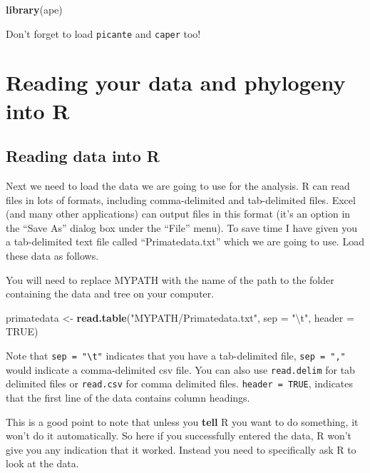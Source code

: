 \documentclass[12pt]{article}
\newcommand{\KeywordTok}[1]{\textcolor[rgb]{0.13,0.29,0.53}{\textbf{{#1}}}}
\newcommand{\DataTypeTok}[1]{\textcolor[rgb]{0.13,0.29,0.53}{{#1}}}
\newcommand{\CharTok}[1]{\textcolor[rgb]{0.31,0.60,0.02}{{#1}}}
\newcommand{\StringTok}[1]{\textcolor[rgb]{0.31,0.60,0.02}{{#1}}}
\newcommand{\OtherTok}[1]{\textcolor[rgb]{0.56,0.35,0.01}{{#1}}}
\newcommand{\NormalTok}[1]{{#1}}
\begin{document}
\begin{snugshade}
\begin{Highlighting}[]
\KeywordTok{library}\NormalTok{(ape)}
\end{Highlighting}
\end{snugshade}

Don't forget to load \texttt{picante} and \texttt{caper} too!

\newpage
\section{Reading your data and phylogeny into R}
\subsection{Reading data into R}

Next we need to load the data we are going to use for the analysis. R
can read files in lots of formats, including comma-delimited and
tab-delimited files. Excel (and many other applications) can output
files in this format (it's an option in the ``Save As'' dialog box
under the ``File'' menu). To save time I have given you a tab-delimited
text file called ``Primatedata.txt'' which we are going to use. Load
these data as follows. 

\begin{framed}
You will need to replace MYPATH with the name of the path to the folder containing the data and tree on your computer.
\end{framed}

\begin{snugshade}
\begin{Highlighting}[]
\NormalTok{primatedata <-}\StringTok{ }\KeywordTok{read.table}\NormalTok{(}\StringTok{"MYPATH/Primatedata.txt"}\NormalTok{, }\DataTypeTok{sep =} \StringTok{"}\CharTok{\textbackslash{}t}\StringTok{"}\NormalTok{, }\DataTypeTok{header =} \OtherTok{TRUE}\NormalTok{)}
\end{Highlighting}
\end{snugshade}

Note that \texttt{sep = "\textbackslash{}t"} indicates that you have a tab-delimited file, 
\texttt{sep = ","}  would indicate a comma-delimited csv file. You can also use
\texttt{read.delim} for tab delimited files or \texttt{read.csv} for comma delimited
files. \texttt{header = TRUE}, indicates that the first line of the data contains
column headings.

This is a good point to note that unless you \textbf{tell} R you want to
do something, it won't do it automatically. So here if you successfully
entered the data, R won't give you any indication that it worked.
Instead you need to specifically ask R to look at the data.
\end{document}
